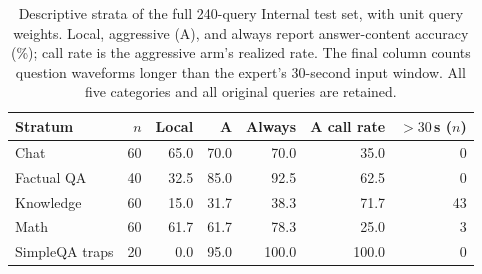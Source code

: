 \begin{table}[h]
\centering\small
\caption{Descriptive strata of the full 240-query Internal test set, with unit query weights. Local, aggressive (A), and always report answer-content accuracy (\%); call rate is the aggressive arm's realized rate. The final column counts question waveforms longer than the expert's 30-second input window. All five categories and all original queries are retained.}
\label{tab:internal-strata}
\begin{tabular}{lrrrrrr}
\toprule
Stratum & $n$ & Local & A & Always & A call rate & $>30$\,s ($n$) \\
\midrule
Chat & 60 & 65.0 & 70.0 & 70.0 & 35.0 & 0 \\
Factual QA & 40 & 32.5 & 85.0 & 92.5 & 62.5 & 0 \\
Knowledge & 60 & 15.0 & 31.7 & 38.3 & 71.7 & 43 \\
Math & 60 & 61.7 & 61.7 & 78.3 & 25.0 & 3 \\
SimpleQA traps & 20 & 0.0 & 95.0 & 100.0 & 100.0 & 0 \\
\bottomrule
\end{tabular}
\end{table}
